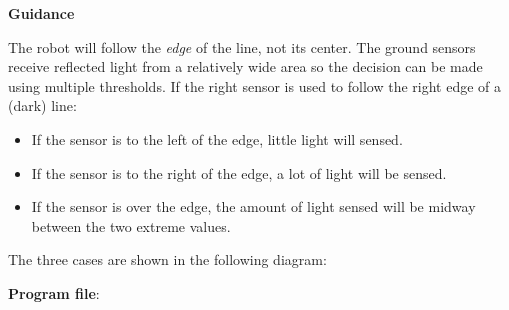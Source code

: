 \textbf{Guidance}

The robot will follow the \emph{edge} of the line, not its center. The ground sensors receive reflected light from a relatively wide area so the decision can be made using multiple thresholds. If the right sensor is used to follow the right edge of a (dark) line:
\begin{itemize}
\item If the sensor is to the left of the edge, little light will sensed.
\item If the sensor is to the right of the edge, a lot of light will be sensed.
\item If the sensor is over the edge, the amount of light sensed will be midway between the two extreme values.
\end{itemize}
The three cases are shown in the following diagram:
\begin{center}
\end{center}

\bigskip

{\raggedleft \hfill \textbf{Program file}: }
